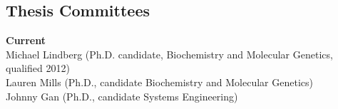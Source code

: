 \documentclass[margin,line]{cv}
\begin{document}
\begin{resume}
    \section{\mysidestyle Thesis Committees}
    \textbf{Current} \\
    Michael Lindberg (Ph.D. candidate, Biochemistry and Molecular Genetics, qualified 2012)\\
    Lauren Mills (Ph.D., candidate Biochemistry and Molecular Genetics)\\
	Johnny Gan (Ph.D., candidate Systems Engineering)



\end{resume}
\end{document}

